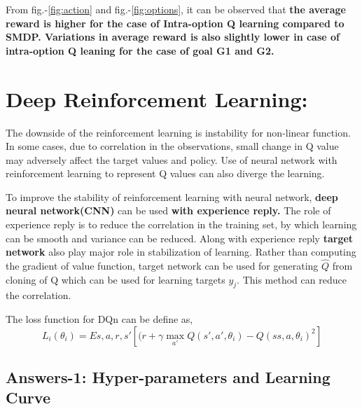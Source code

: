 \documentclass[preprint,12pt]{elsarticle}
\begin{document}
 From fig.-\ref{fig:action} and fig.-\ref{fig:options}, it can be observed that \textbf{the average reward is higher for the case of Intra-option Q learning compared to SMDP. Variations in average reward is also slightly lower in case of intra-option Q leaning for the case of goal G1 and G2.}
 \newpage

\section{Deep Reinforcement Learning:}
 The downside of the reinforcement learning is instability for non-linear function. In some cases, due to correlation in the observations, small change in Q value may adversely affect the target values and policy. Use of neural network with reinforcement learning to represent Q values can also diverge the learning.
 
 To improve the stability of  reinforcement learning with neural network, \textbf{deep neural network(CNN)} can be used \textbf{with experience reply.}\cite{david} \cite{mnih2015human} \cite{sutton2018reinforcement} The role of  experience reply is to reduce the correlation in the training set, by which learning can be smooth and variance can be reduced. Along with experience reply \textbf{target network} also play major role in stabilization of learning. Rather than computing the gradient of value function, target network can be used for generating $\hat{Q}$ from cloning of Q which can be used for learning targets $y_j$. This method can reduce the correlation.
 
 The loss function for DQn can be define as,
 \begin{equation}
 	L_i(\theta_i)  = E{s,a,r,s'}[(r+\gamma \max_{a'} Q(s',a',\theta_i) - Q(ss,a,\theta_i)^2]
 \end{equation} 
	
\subsection{Answers-1: Hyper-parameters and Learning Curve}\cite{git}	
\end{document}
